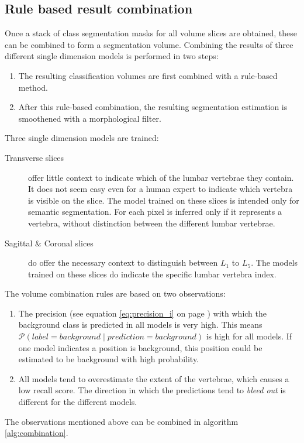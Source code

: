 \subsection{Rule based result combination}
Once a stack of class segmentation masks for all volume slices are obtained, these can be combined to form a segmentation volume.
Combining the results of three different single dimension models is performed in two steps:
\begin{enumerate}
    \item The resulting classification volumes are first combined with a rule-based method.
    \item After this rule-based combination, the resulting segmentation estimation is smoothened with a morphological filter.
\end{enumerate}

Three single dimension models are trained:
\begin{description}
    \item[Transverse slices] offer little context to indicate which of the lumbar vertebrae they contain. 
    It does not seem easy even for a human expert to indicate which vertebra is visible on the slice.
    The model trained on these slices is intended only for semantic segmentation.
    For each pixel is inferred only if it represents a vertebra, without distinction between the different lumbar vertebrae. 
    \item[Sagittal \& Coronal slices] do offer the necessary context to distinguish between $L_1$ to $L_5$. 
    The models trained on these slices do indicate the specific lumbar vertebra index. 
\end{description}

The volume combination rules are based on two observations:
\begin{enumerate}
    \item The precision (see equation \ref{eq:precision_i} on page \pageref{eq:precision_i}) with which the background class is predicted in all models is very high.\newline
            This means $\mathcal{P} \left( label = background \mid prediction = background \right)$ is high for all models. 
            If one model indicates a position is background, this position could be estimated to be background with high probability.
    \item All models tend to overestimate the extent of the vertebrae, which causes a low recall score. The direction in which the predictions tend to \textit{bleed out} is different for the different models. 
\end{enumerate}
The observations mentioned above can be combined in algorithm \ref{alg:combination}.

